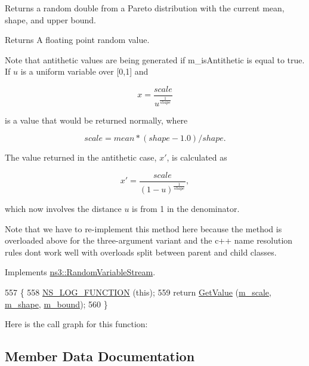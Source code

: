 Returns a random double from a Pareto distribution with the current mean, shape, and upper bound. 

\begin{DoxyReturn}{Returns}
A floating point random value.
\end{DoxyReturn}
Note that antithetic values are being generated if m\+\_\+is\+Antithetic is equal to true. If $u$ is a uniform variable over \mbox{[}0,1\mbox{]} and

\[ x = \frac{scale}{u^{\frac{1}{shape}}} \]

is a value that would be returned normally, where

\[ scale = mean * (shape - 1.0) / shape . \]

The value returned in the antithetic case, $x'$, is calculated as

\[ x' = \frac{scale}{{(1 - u)}^{\frac{1}{shape}}} , \]

which now involves the distance $u$ is from 1 in the denominator.

Note that we have to re-\/implement this method here because the method is overloaded above for the three-\/argument variant and the c++ name resolution rules don\textquotesingle{}t work well with overloads split between parent and child classes. 

Implements \hyperlink{classns3_1_1RandomVariableStream_a4fa5944dc4cb11544e661ed23072b36c}{ns3\+::\+Random\+Variable\+Stream}.


\begin{DoxyCode}
557 \{
558   \hyperlink{log-macros-disabled_8h_a90b90d5bad1f39cb1b64923ea94c0761}{NS\_LOG\_FUNCTION} (\textcolor{keyword}{this});
559   \textcolor{keywordflow}{return} \hyperlink{classns3_1_1ParetoRandomVariable_af5588dd7354a1de1a3926fbf8c6edd74}{GetValue} (\hyperlink{classns3_1_1ParetoRandomVariable_a2c52677237cc9bce3c01ea0052444d81}{m\_scale}, \hyperlink{classns3_1_1ParetoRandomVariable_a606ababe260201098981f88c30fa8b39}{m\_shape}, \hyperlink{classns3_1_1ParetoRandomVariable_ab9bf62721171d3bc401081cdaa22e1b7}{m\_bound});
560 \}
\end{DoxyCode}


Here is the call graph for this function\+:




\subsection{Member Data Documentation}

